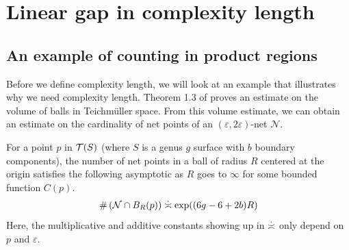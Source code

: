 \documentclass[12pt, reqno]{amsart}
\begin{document}


\section{Linear gap in complexity length}
\label{sec:line-gap-compl}

\subsection{An example of counting in product regions}
\label{sec:an-example-counting}

Before we define complexity length, we will look at an example that illustrates why we need complexity length.
Theorem 1.3 of \textcite{10.1215/00127094-1548443} proves an estimate on the volume of balls in Teichmüller space.
From this volume estimate, we can obtain an estimate on the cardinality of net points of an $(\varepsilon, 2 \varepsilon)$-net $\mathcal{N}$.
\begin{theorem}
  \label{thm:abem}
  For a point $p$ in $\mathcal{T}(S)$ (where $S$ is a genus $g$ surface with $b$ boundary components), the number of net points in a ball of radius $R$ centered at the origin satisfies the following asymptotic as $R$ goes to $\infty$ for some bounded function $C(p)$.
  \begin{align*}
    \#\left( \mathcal{N} \cap B_R(p) \right) \emul \exp((6g-6 + 2b)R)
  \end{align*}
  Here, the multiplicative and additive constants showing up in $\emul$ only depend on $p$ and $\varepsilon$.
\end{theorem}
\end{document}
